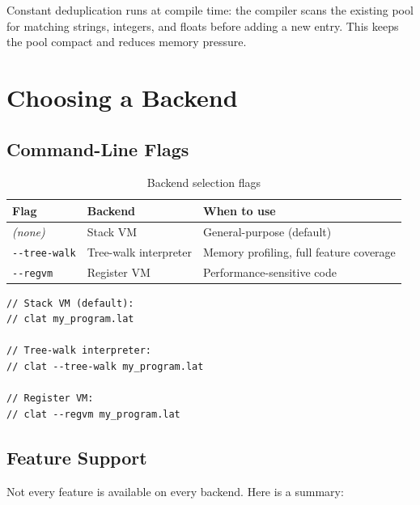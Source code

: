Constant deduplication runs at compile time: the compiler scans the existing
pool for matching strings, integers, and floats before adding a new entry. This
keeps the pool compact and reduces memory pressure.

\section{Choosing a Backend}\label{sec:choosing-backend}

\subsection{Command-Line Flags}

\begin{table}[h]
\centering
\caption{Backend selection flags}\label{tab:backend-flags}
\begin{tabular}{@{} l l l @{}}
\toprule
\textbf{Flag} & \textbf{Backend} & \textbf{When to use} \\
\midrule
\emph{(none)} & Stack VM & General-purpose (default) \\
\lstinline|--tree-walk| & Tree-walk interpreter & Memory profiling, full feature coverage \\
\lstinline|--regvm| & Register VM & Performance-sensitive code \\
\bottomrule
\end{tabular}
\end{table}

\begin{lstlisting}[language=Lattice, caption={Selecting a backend from the command line}]
// Stack VM (default):
// clat my_program.lat

// Tree-walk interpreter:
// clat --tree-walk my_program.lat

// Register VM:
// clat --regvm my_program.lat
\end{lstlisting}

\subsection{Feature Support}\label{subsec:feature-matrix}

Not every feature is available on every backend. Here is a summary:

